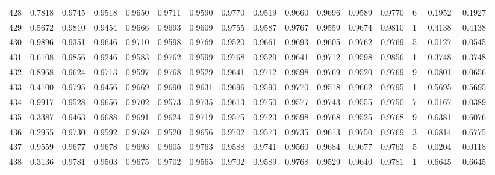 \begin{tabular}{lrrrrrrrrrrrrrrr}
428 &      0.7818 &  0.9745 &  0.9518 &  0.9650 &  0.9711 &  0.9590 &  0.9770 &  0.9519 &  0.9660 &  0.9696 &   0.9589 &     0.9770 &      6 &                    0.1952 &                     0.1927 \\
429 &      0.5672 &  0.9810 &  0.9454 &  0.9666 &  0.9693 &  0.9609 &  0.9755 &  0.9587 &  0.9767 &  0.9559 &   0.9674 &     0.9810 &      1 &                    0.4138 &                     0.4138 \\
430 &      0.9896 &  0.9351 &  0.9646 &  0.9710 &  0.9598 &  0.9769 &  0.9520 &  0.9661 &  0.9693 &  0.9605 &   0.9762 &     0.9769 &      5 &                   -0.0127 &                    -0.0545 \\
431 &      0.6108 &  0.9856 &  0.9246 &  0.9583 &  0.9762 &  0.9599 &  0.9768 &  0.9529 &  0.9641 &  0.9712 &   0.9598 &     0.9856 &      1 &                    0.3748 &                     0.3748 \\
432 &      0.8968 &  0.9624 &  0.9713 &  0.9597 &  0.9768 &  0.9529 &  0.9641 &  0.9712 &  0.9598 &  0.9769 &   0.9520 &     0.9769 &      9 &                    0.0801 &                     0.0656 \\
433 &      0.4100 &  0.9795 &  0.9456 &  0.9669 &  0.9690 &  0.9631 &  0.9696 &  0.9590 &  0.9770 &  0.9518 &   0.9662 &     0.9795 &      1 &                    0.5695 &                     0.5695 \\
434 &      0.9917 &  0.9528 &  0.9656 &  0.9702 &  0.9573 &  0.9735 &  0.9613 &  0.9750 &  0.9577 &  0.9743 &   0.9555 &     0.9750 &      7 &                   -0.0167 &                    -0.0389 \\
435 &      0.3387 &  0.9463 &  0.9688 &  0.9691 &  0.9624 &  0.9719 &  0.9575 &  0.9723 &  0.9598 &  0.9768 &   0.9525 &     0.9768 &      9 &                    0.6381 &                     0.6076 \\
436 &      0.2955 &  0.9730 &  0.9592 &  0.9769 &  0.9520 &  0.9656 &  0.9702 &  0.9573 &  0.9735 &  0.9613 &   0.9750 &     0.9769 &      3 &                    0.6814 &                     0.6775 \\
437 &      0.9559 &  0.9677 &  0.9678 &  0.9693 &  0.9605 &  0.9763 &  0.9588 &  0.9741 &  0.9560 &  0.9684 &   0.9677 &     0.9763 &      5 &                    0.0204 &                     0.0118 \\
438 &      0.3136 &  0.9781 &  0.9503 &  0.9675 &  0.9702 &  0.9565 &  0.9702 &  0.9589 &  0.9768 &  0.9529 &   0.9640 &     0.9781 &      1 &                    0.6645 &                     0.6645 \\

\end{tabular}
